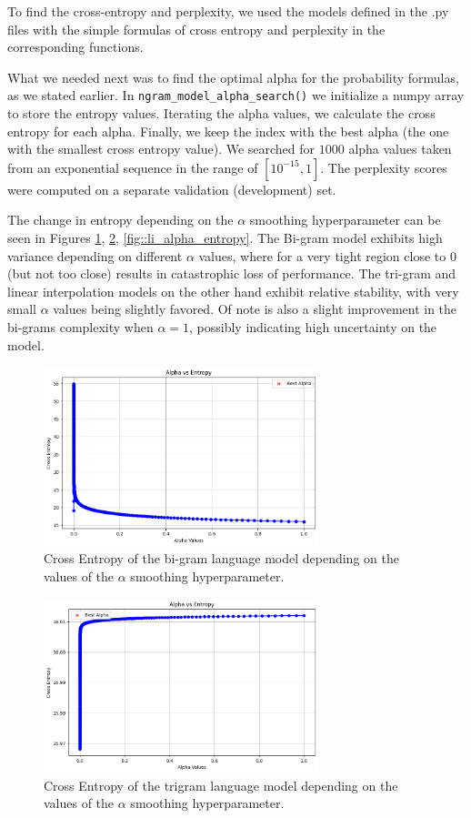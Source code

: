 \documentclass[11pt, a4paper]{article}
\begin{document}
	To find the cross-entropy and perplexity, we used the models defined in the .py files with the simple formulas of cross entropy and perplexity in the corresponding functions. 
	
	What we needed next was to find the optimal alpha for the probability formulas, as we stated earlier. In \texttt{ngram\_model\_alpha\_search()} we initialize a numpy array to store the entropy values. Iterating the alpha values, we calculate the cross entropy for each alpha. Finally, we keep the index with the best alpha (the one with the smallest cross entropy value). We searched for $1000$ alpha values taken from an exponential sequence in the range of $[10^{-15}, 1]$. The perplexity scores were computed on a separate validation (development) set.
	
	The change in entropy depending on the $\alpha$ smoothing hyperparameter can be seen in Figures \ref{fig::bi_alpha_entropy}, \ref{fig::tri_alpha_entropy}, \ref{fig::li_alpha_entropy}. The Bi-gram model exhibits high variance depending on different $\alpha$ values, where for a very tight region close to 0 (but not too close) results in catastrophic loss of performance. The tri-gram and linear interpolation models on the other hand exhibit relative stability, with very small $\alpha$ values being slightly favored. Of note is also a slight improvement in the bi-grams complexity when $\alpha=1$, possibly indicating high uncertainty on the model.
	
	
	 \begin{figure}
	    \centering
	    \includegraphics[width=8cm]{"bi_alpha.png"}
	    \caption{Cross Entropy of the bi-gram language model depending on the values of the $\alpha$ smoothing hyperparameter.}
	    \label{fig::bi_alpha_entropy}
	\end{figure}

	\begin{figure}
		\centering
		\includegraphics[width=8cm]{"tri_alpha.png"}
		\caption{Cross Entropy of the trigram language model depending on the values of the $\alpha$ smoothing hyperparameter.}
		\label{fig::tri_alpha_entropy}
	\end{figure}
	
\end{document}
